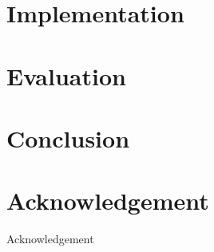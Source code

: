 \documentclass[12pt]{b-thesis}
\begin{document}
\chapter{Implementation}
\label{chap:implementation}


\chapter{Evaluation}
\label{chap:validation}


\chapter{Conclusion} 
\label{chap:conclusion}


\chapter*{Acknowledgement} 
{\protect\numberline {}Acknowledgement}


\thispagestyle{plain}
%


\end{document}
